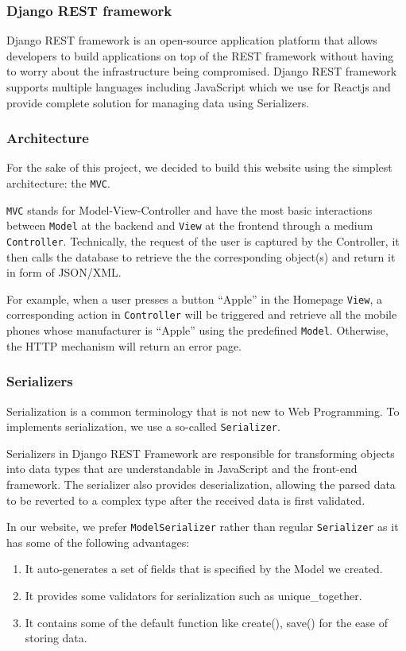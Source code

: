 \documentclass[a4paper]{article}
\numberwithin{equation}{section}
\begin{document}
\subsubsection{Django REST framework}
Django REST framework is an open-source application platform that allows developers to build applications on top of the REST framework without having to worry about the infrastructure being compromised.
Django REST framework supports multiple languages including JavaScript which we use for Reactjs and provide complete solution for managing data using Serializers.

\subsubsection{Architecture}
For the sake of this project, we decided to build this website using the simplest architecture: the \texttt{MVC}.

\texttt{MVC} stands for Model-View-Controller and have the most basic interactions between \texttt{Model} at the backend and \texttt{View} at the frontend through a medium \texttt{Controller}.
Technically, the request of the user is captured by the Controller, it then calls the database to retrieve the the corresponding object(s) and return it in form of JSON/XML\@.

For example, when a user presses a button ``Apple'' in the Homepage \texttt{View}, a corresponding action in \texttt{Controller} will be triggered and retrieve all the mobile phones whose manufacturer is ``Apple'' using the predefined \texttt{Model}.
Otherwise, the HTTP mechanism will return an error page.

\subsubsection{Serializers}
Serialization is a common terminology that is not new to Web Programming.
To implements serialization, we use a so-called \texttt{Serializer}.

Serializers in Django REST Framework are responsible for transforming objects into data types that are understandable in JavaScript and the front-end framework.
The serializer also provides deserialization, allowing the parsed data to be reverted to a complex type after the received data is first validated.

In our website, we prefer \texttt{ModelSerializer} rather than regular \texttt{Serializer} as it has some of the following advantages:
\begin{enumerate}
  \item It auto-generates a set of fields that is specified by the Model we created.
  \item It provides some validators for serialization such as unique\_together.
  \item It contains some of the default function like create(), save() for the ease of storing data.
\end{enumerate}
\end{document}
